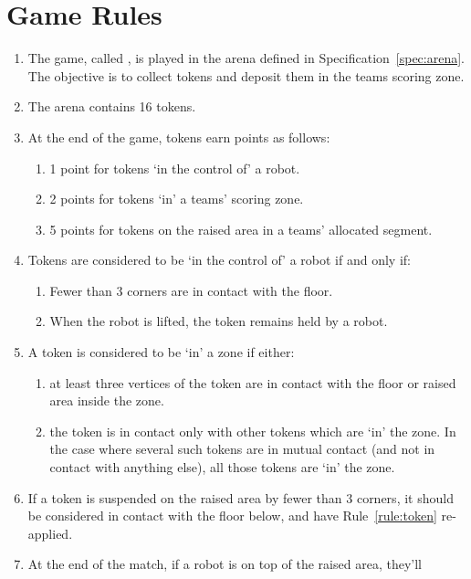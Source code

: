 \section{Game Rules}
\label{sec:rules}

\begin{enumerate}
  \item The game, called \emph{\gamename}, is played in the arena defined in
        Specification~\ref{spec:arena}. The objective is to collect tokens and
        deposit them in the teams scoring zone.
  \item The arena contains 16 tokens.
  \item At the end of the game, tokens earn points as follows:
    \begin{enumerate}
      \item 1 point for tokens `in the control of' a robot.
      \item 2 points for tokens `in' a teams' scoring zone.
      \item 5 points for tokens on the raised area in a teams' allocated segment.
    \end{enumerate}
  \item Tokens are considered to be `in the control of' a robot if and only if:
    \begin{enumerate}
      \item Fewer than 3 corners are in contact with the floor.
      \item When the robot is lifted, the token remains held by a robot.
    \end{enumerate}
  \item \label{rule:token} A token is considered to be `in' a zone if either:
    \begin{enumerate}
      \item at least three vertices of the token are in contact with the floor or
            raised area inside the zone.
      \item the token is in contact only with other tokens which are `in' the zone.
            In the case where several such tokens are in mutual contact (and not in
            contact with anything else), all those tokens are `in' the zone.
    \end{enumerate}
  \item If a token is suspended on the raised area by fewer than 3 corners, it should be considered
        in contact with the floor below, and have Rule~\ref{rule:token} re-applied.
  \item At the end of the match, if a robot is on top of the raised area, they'll

\end{enumerate}
